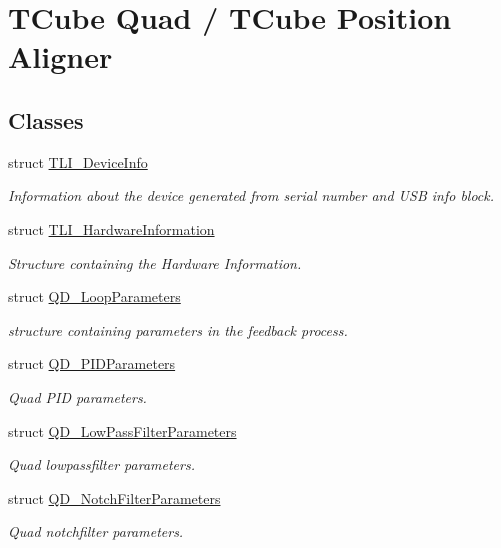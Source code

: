 \hypertarget{group___t_cube_quad}{}\section{T\+Cube Quad / T\+Cube Position Aligner}
\label{group___t_cube_quad}
\subsection*{Classes}
\begin{DoxyCompactItemize}
\item 
struct \hyperlink{struct_t_l_i___device_info}{T\+L\+I\+\_\+\+Device\+Info}
\begin{DoxyCompactList}\small\item\em Information about the device generated from serial number and U\+SB info block. \end{DoxyCompactList}\item 
struct \hyperlink{struct_t_l_i___hardware_information}{T\+L\+I\+\_\+\+Hardware\+Information}
\begin{DoxyCompactList}\small\item\em Structure containing the Hardware Information. \end{DoxyCompactList}\item 
struct \hyperlink{struct_q_d___loop_parameters}{Q\+D\+\_\+\+Loop\+Parameters}
\begin{DoxyCompactList}\small\item\em structure containing parameters in the feedback process. \end{DoxyCompactList}\item 
struct \hyperlink{struct_q_d___p_i_d_parameters}{Q\+D\+\_\+\+P\+I\+D\+Parameters}
\begin{DoxyCompactList}\small\item\em Quad P\+ID parameters. \end{DoxyCompactList}\item 
struct \hyperlink{struct_q_d___low_pass_filter_parameters}{Q\+D\+\_\+\+Low\+Pass\+Filter\+Parameters}
\begin{DoxyCompactList}\small\item\em Quad lowpassfilter parameters. \end{DoxyCompactList}\item 
struct \hyperlink{struct_q_d___notch_filter_parameters}{Q\+D\+\_\+\+Notch\+Filter\+Parameters}
\begin{DoxyCompactList}\small\item\em Quad notchfilter parameters. \end{DoxyCompactList}\item 

\end{DoxyCompactItemize}
